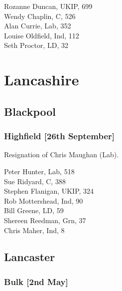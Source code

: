 \documentclass[a4paper,openany,10pt]{book}
\begin{document}
Rozanne Duncan, UKIP, 699\\
Wendy Chaplin, C, 526\\
Alan Currie, Lab, 352\\
Louise Oldfield, Ind, 112\\
Seth Proctor, LD, 32\\


\vfill

\section{Lancashire}

\subsection*{Blackpool}

\subsubsection*{Highfield \hspace*{\fill}\nolinebreak[1]%
\enspace\hspace*{\fill}
[26th September]}


Resignation of Chris Maughan (Lab).



Peter Hunter, Lab, 518\\
Sue Ridyard, C, 388\\
Stephen Flanigan, UKIP, 324\\
Rob Mottershead, Ind, 90\\
Bill Greene, LD, 59\\
Shereen Reedman, Grn, 37\\
Chris Maher, Ind, 8\\


\subsection*{Lancaster}

\subsubsection*{Bulk \hspace*{\fill}\nolinebreak[1]%
\enspace\hspace*{\fill}
[2nd May]}
\end{document}
